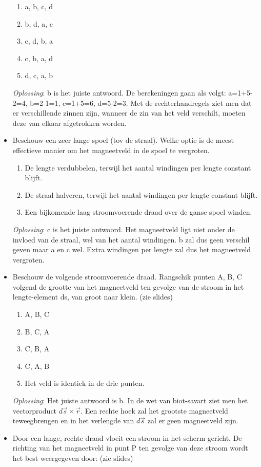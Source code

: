 \documentclass[12pt,a4paper]{article}
\begin{document}
\begin{itemize}
\begin{enumerate}[label=\alph*]
    		\item a, b, c, d
    		\item b, d, a, c
    		\item c, d, b, a
    		\item c, b, a, d
    		\item d, c, a, b
    	\end{enumerate}
    	\textit{Oplossing}: b is het juiste antwoord. De berekeningen gaan als volgt: a=1+5-2=4, b=2-1=1, c=1+5=6, d=5-2=3. Met de rechterhandregels ziet men dat er verschillende zinnen zijn, wanneer de zin van het veld verschilt, moeten deze van elkaar afgetrokken worden. 
    	\item Beschouw een zeer lange spoel (tov de straal). Welke optie is de meest effectieve manier om het magneetveld in de spoel te vergroten. 
    	\begin{enumerate}[label=\alph*]
    		\item De lengte verdubbelen, terwijl het aantal windingen per lengte constant blijft.
    		\item De straal halveren, terwijl het aantal windingen per lengte constant blijft.
    		\item Een bijkomende laag stroomvoerende draad over de ganse spoel winden. 
    	\end{enumerate}
    	\textit{Oplossing}: c is het juiste antwoord. Het magneetveld ligt niet onder de invloed van de straal, wel van het aantal windingen. b zal dus geen verschil geven maar a en c wel. Extra windingen per lengte zal dus het magneetveld vergroten. 
    	\item Beschouw de volgende stroomvoerende draad. Rangschik punten A, B, C volgend de grootte van het magneetveld ten gevolge van de stroom in het lengte-element ds, van groot naar klein. (zie slides)
    	\begin{enumerate}[label=\alph*]
    		\item A, B, C
    		\item B, C, A
    		\item C, B, A
    		\item C, A, B
    		\item Het veld is identiek in de drie punten.
    	\end{enumerate}
    	\textit{Oplossing}: Het juiste antwoord is b. In de wet van biot-savart ziet men het vectorproduct $d\vec{s}\times\vec{r}$. Een rechte hoek zal het grootste magneetveld teweegbrengen en in het verlengde van $d\vec{s}$ zal er geen magneetveld zijn. 
    	\item Door een lange, rechte draad vloeit een stroom in het scherm gericht. De richting van het magneetveld in punt P ten gevolge van deze stroom wordt het best weergegeven door: (zie slides)

\end{itemize}
\end{document}
